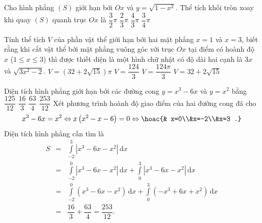 \begin{ex}%
	Cho hình phẳng $(S)$ giới hạn bởi $Ox$ và $y=\sqrt{1-x^2}$. Thể tích khối tròn xoay khi quay $(S)$ quanh trục $Ox$ là
	\choice
	{$\dfrac{3}{2}\pi $}
	{$\dfrac{2}{3}\pi $}
	{\True $\dfrac{4}{3}\pi $}
	{$\dfrac{3}{4}\pi $}
\end{ex}
\begin{ex}%
	Tính thể tích $V$ của phần vật thể giới hạn bởi hai mặt phẳng $x=1$ và $x=3$, biết rằng khi cắt vật thể bởi mặt phẳng vuông góc với trục $Ox$ tại điểm có hoành độ $x$ ($1\le x\le 3$) thì được thiết diện là một hình chữ nhật có độ dài hai cạnh là $3x$ và $\sqrt{3x^2-2}$.
	\choice
	{$V=(32+2\sqrt{15})\pi$}
	{\True $V=\dfrac{124}{3}$}
	{$V=\dfrac{124\pi}{3}$}
	{$V=32+2\sqrt{15}$}
\end{ex}
\begin{ex}%
	Diện tích hình phẳng giới hạn bởi các đường cong $y=x^3-6x$ và $y=x^2$ bằng
	\choice
	{$\dfrac{125}{12}$}
	{$\dfrac{16}{3}$}
	{$\dfrac{63}{4}$}
	{\True $\dfrac{253}{12}$}
	\loigiai
	{
	Xét phương trình hoành độ giao điểm của hai đường cong đã cho $$x^3-6x=x^2\Leftrightarrow x\left (x^2-x-6 \right )=0\Leftrightarrow\hoac{& x=0\\&x=-2\\&x=3 .}$$
	Diện tích hình phẳng cần tìm là
	\allowdisplaybreaks
	\begin{eqnarray*}
	S&=&\displaystyle\int\limits_{-2}^{3}\left |x^3-6x-x^2 \right |\mathrm{\,d}x\\
	&=&\displaystyle\int\limits_{-2}^{0}\left |x^3-6x-x^2 \right |\mathrm{\,d}x+\displaystyle\int\limits_{0}^{3}\left |x^3-6x-x^2 \right |\mathrm{\,d}x\\
	&=&\displaystyle\int\limits_{-2}^{0}\left(x^3-6x-x^2 \right)\mathrm{\,d}x+\displaystyle\int\limits_{0}^{3}\left(-x^3+6x+x^2 \right)\mathrm{\,d}x\\
	&=&\dfrac{16}{3}+\dfrac{63}{4}=\dfrac{253}{12}.
	\end{eqnarray*}
	}
\end{ex}
